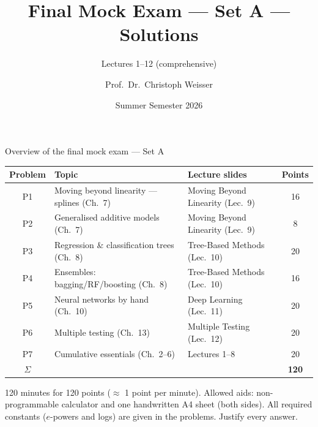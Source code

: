 \documentclass[aspectratio=169,11pt]{beamer}
\title{Final Mock Exam --- Set A --- Solutions}
\subtitle{Lectures 1--12 (comprehensive)}
\author{Prof.\ Dr.\ Christoph Weisser}\institute{Quantitative Research Methods \textperiodcentered\ HSBI}
\date{Summer Semester 2026}\graphicspath{{images/}}
\begin{document}
\begin{frame}[plain]\titlepage\end{frame}

\begin{frame}{Overview of the final mock exam --- Set A}
  \scriptsize
  \begin{center}
  \begin{tabular}{@{}cllc@{}}
    \toprule
    \textbf{Problem} & \textbf{Topic} & \textbf{Lecture slides} & \textbf{Points}\\
    \midrule
    P1 & Moving beyond linearity --- splines (Ch.\ 7) & Moving Beyond Linearity (Lec.\ 9) & 16\\
    P2 & Generalised additive models (Ch.\ 7) & Moving Beyond Linearity (Lec.\ 9) & 8\\
    P3 & Regression \& classification trees (Ch.\ 8) & Tree-Based Methods (Lec.\ 10) & 20\\
    P4 & Ensembles: bagging/RF/boosting (Ch.\ 8) & Tree-Based Methods (Lec.\ 10) & 16\\
    P5 & Neural networks by hand (Ch.\ 10) & Deep Learning (Lec.\ 11) & 20\\
    P6 & Multiple testing (Ch.\ 13) & Multiple Testing (Lec.\ 12) & 20\\
    P7 & Cumulative essentials (Ch.\ 2--6) & Lectures 1--8 & 20\\
    \midrule
    $\Sigma$ & & & \textbf{120}\\
    \bottomrule
  \end{tabular}
  \end{center}
  \vspace{2pt}
  \begin{takeaway}
    120 minutes for 120 points ($\approx$ 1 point per minute). Allowed aids: non-programmable
    calculator and one handwritten A4 sheet (both sides). All required constants ($e$-powers
    and logs) are given in the problems. Justify every answer.
  \end{takeaway}
\end{frame}
\end{document}
